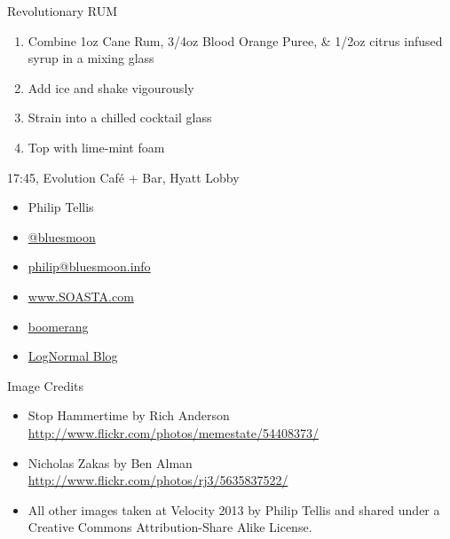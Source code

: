 \documentclass{beamer}
\begin{document}
\begin{frame}{Revolutionary RUM}
  \begin{enumerate}
    \item Combine 1oz Cane Rum, 3/4oz Blood Orange Puree, \& 1/2oz citrus infused syrup in a mixing glass
    \item Add ice and shake vigourously
    \item Strain into a chilled cocktail glass
    \item Top with lime-mint foam
  \end{enumerate}

\vspace{1 cm}
17:45, Evolution Caf\'{e} + Bar, Hyatt Lobby
\end{frame}

\begin{frame}
  \begin{itemize}
  \item Philip Tellis
  \item \href{http://twitter.com/bluesmoon}{@bluesmoon}
  \item \href{http://bluesmoon.info/}{philip@bluesmoon.info}
  \item \href{http://www.soasta.com/}{www.SOASTA.com}
  \item \href{http://lognormal.github.com/boomerang/doc/}{boomerang}
  \item \href{http://www.lognormal.com/blog/}{LogNormal Blog}
  \end{itemize}
\end{frame}

\begin{frame}{Image Credits}
\begin{itemize}
  \item Stop Hammertime by Rich Anderson \\ \small \href{http://www.flickr.com/photos/memestate/54408373/}{http://www.flickr.com/photos/memestate/54408373/}
  \item Nicholas Zakas by Ben Alman \\ \small \href{http://www.flickr.com/photos/rj3/5635837522/}{http://www.flickr.com/photos/rj3/5635837522/}
  \item All other images taken at Velocity 2013 by Philip Tellis and shared under a Creative Commons Attribution-Share Alike License.
\end{itemize}
\end{frame}
\end{document}
